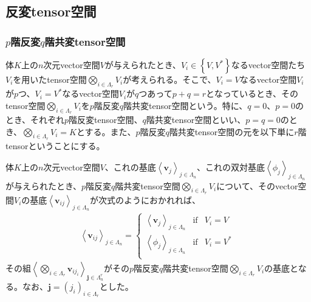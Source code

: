 \documentclass[dvipdfmx]{jsarticle}
\begin{document}
\subsection{反変tensor空間}%
\subsubsection{$p$階反変$q$階共変tensor空間}%
\begin{dfn}
体$K$上の$n$次元vector空間$V$が与えられたとき、$V_{i} \in \left\{ V,V^{*} \right\}$なるvector空間たち$V_{i}$を用いたtensor空間$\bigotimes_{i \in \varLambda_{r}} V_{i}$が考えられる。そこで、$V_{i} = V$なるvector空間$V_{i}$が$p$つ、$V_{i} = V^{*}$なるvector空間$V_{i}$が$q$つあって$p + q = r$となっているとき、そのtensor空間$\bigotimes_{i \in \varLambda_{r}} V_{i}$を$p$階反変$q$階共変tensor空間という。特に、$q = 0$、$p = 0$のとき、それぞれ$p$階反変tensor空間、$q$階共変tensor空間といい、$p = q = 0$のとき、$\bigotimes_{i \in \varLambda_{r}} V_{i} = K$とする。また、$p$階反変$q$階共変tensor空間の元を以下単に$r$階tensorということにする。
\end{dfn}
\begin{thm}\label{2.4.8.1}
体$K$上の$n$次元vector空間$V$、これの基底$\left\langle \mathbf{v}_{j} \right\rangle_{j \in \varLambda_{n}}$、これの双対基底$\left\langle \phi_{j} \right\rangle_{j \in \varLambda_{n}}$が与えられたとき、$p$階反変$q$階共変tensor空間$\bigotimes_{i \in \varLambda_{r}} V_{i}$について、そのvector空間$V_{i}$の基底$\left\langle \mathbf{v}_{ij} \right\rangle_{j \in \varLambda_{n}}$が次式のようにおかれれば、
\begin{align*}
\left\langle \mathbf{v}_{ij} \right\rangle_{j \in \varLambda_{n}} = \left\{ \begin{matrix}
\left\langle \mathbf{v}_{j} \right\rangle_{j \in \varLambda_{n}} & \mathrm{if} & V_{i} = V \\
\left\langle \phi_{j} \right\rangle_{j \in \varLambda_{n}} & \mathrm{if} & V_{i} = V^{*} \\
\end{matrix} \right.\ 
\end{align*}
その組$\left\langle \bigotimes_{i \in \varLambda_{r}} \mathbf{v}_{ij_{i}} \right\rangle_{\mathbf{j} \in \varLambda_{n}^{r}}$がその$p$階反変$q$階共変tensor空間$\bigotimes_{i \in \varLambda_{r}} V_{i}$の基底となる。なお、$\mathbf{j}=\left( j_{i} \right)_{i \in \varLambda_{r}}$とした。
\end{thm}
\end{document}
